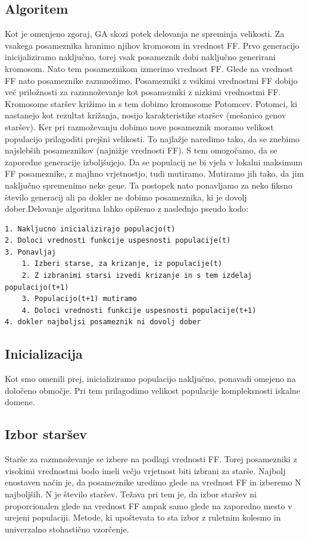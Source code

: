 \documentclass[a4paper, 12pt]{book}
\begin{document}
\subsection{Algoritem}
Kot je omenjeno zgoraj, GA skozi potek delovanja ne spreminja velikosti. Za vsakega posameznika hranimo njihov kromosom in vrednost FF. Prvo generacijo inicijaliziramo naključno, torej vsak posameznik dobi naključno generirani kromosom. Nato tem posameznikom izmerimo vrednost FF. Glede na vrednost FF nato posameznike razmnožimo. Posamezniki z vsikimi vrednostmi FF dobijo več priložnosti za razmnoževanje kot posamezniki z nizkimi vrednostmi FF. Kromosome staršev križimo in s tem dobimo kromosome Potomcev. Potomci, ki nastanejo kot rezultat križanja, nosijo karakteristike staršev (mešanico genov staršev). Ker pri razmoževanju dobimo nove posameznik moramo velikost populacijo prilagoditi prejšni velikosti. To najlažje naredimo tako, da se znebimo najslebših posameznikov (najnižje vrednosti FF). S tem omogočamo, da se zaporedne generacije izboljšujejo. Da se populacij ne bi vjela v lokalni maksimum FF posameznike, z majhno vrjetnostjo, tudi mutiramo. Mutiramo jih tako, da jim naključno spremenimo neke gene. Ta postopek nato ponavljamo za neko fiksno število generacij ali pa dokler ne dobimo posameznika, ki je dovolj dober.\newpage Delovanje algoritma lahko opišemo z naslednjo pseudo kodo:
\begin{lstlisting}
1. Nakljucno inicializirajo populacjo(t)
2. Doloci vrednosti funkcije uspesnosti populacije(t)
3. Ponavljaj
	1. Izberi starse, za krizanje, iz populacije(t)
	2. Z izbranimi starsi izvedi krizanje in s tem izdelaj populacijo(t+1)
	3. Populacijo(t+1) mutiramo
	4. Doloci vrednosti funkcije uspesnosti populacije(t+1)
4. dokler najboljsi posameznik ni dovolj dober
\end{lstlisting}
\subsection{Inicializacija}
Kot smo omenili prej, inicializiramo populacijo naključno, ponavadi omejeno na določeno območje. Pri tem prilagodimo velikost populacije kompleksnosti iskalne domene.
\subsection{Izbor staršev}
Starše za razmnoževanje se izbere na podlagi vrednosti FF. Torej posamezniki z visokimi vrednostmi bodo imeli večjo vrjetnost biti izbrani za starše. Najbolj enostaven način je, da posameznike uredimo glede na vrednost FF in izberemo N  najboljših. N je število staršev. Težava pri tem je, da izbor staršev ni proporcionalen glede na vrednost FF ampak samo glede na zaporedno mesto v urejeni populaciji. Metode, ki upoštevata to sta izbor z ruletnim kolesmo in univerzalno stohastično vzorčenje.
\end{document}
